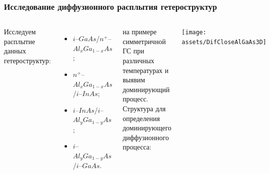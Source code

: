 \documentclass[10pt,pdf,hyperref={unicode},aspectratio={169}]{beamer}
\begin{document}
\begin{frame}
	\frametitle{Исследование диффузионного расплытия гетероструктур}
	\begin{columns}
		Исследуем расплытие данных гетероструктур:
		\begin{itemize}
			\item $i$--$GaAs$/$n^{+}$--$Al_{x}Ga_{1-x}As$;
			\item $n^{+}$--$Al_{x}Ga_{1-x}As$/$i$--$InAs$;
			\item $i$--$InAs$/$i$--$Al_{y}Ga_{1-y}As$;
			\item $i$--$Al_{y}Ga_{1-y}As$/$i$--$GaAs$.
		\end{itemize}
		на примере симметричной ГС при различных температурах и выявим доминирующий процесс.
		Структура для определения доминирующего диффузионного процесса:
		\begin{center}
			\texttt{[image: assets/DifCloseAlGaAs3D]}
		\end{center}
	\end{columns}
\end{frame}
\end{document}
